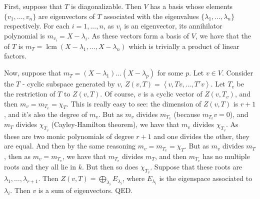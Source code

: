 \documentclass[12pt]{article}
\begin{document}
First, suppose that $T$ is diagonalizable. Then $V$ has a basis whose elements $\{v_{1}, \ldots, v_{n}\}$ are eigenvectors of $T$ associated with the eigenvalues $\{\lambda_{1}, \ldots, \lambda_{n}\}$ respectively. For each $i=1,...,n$, as $v_{i}$ is an eigenvector, its annihilator polynomial is $m_{v_{i}}=X-\lambda_{i}$. As these vectors form a basis of $V$, we have that the  of $T$ is $m_{T}=\operatorname{lcm}(X-\lambda_{1}, \ldots, X-\lambda_{n})$ which is trivially a product of linear factors.

Now, suppose that $m_{T}=(X-\lambda_{1}) \ldots (X-\lambda_{p})$ for some $p$.
Let $v \in V$. Consider the $T$ - cyclic subspace generated by $v$, $Z(v,T)=\left<v, Tv, \ldots, T^{r}v\right>$. Let $T_{v}$ be the restriction of $T$ to $Z(v,T)$. Of course, $v$ is a cyclic vector of $Z(v,T_{v})$, and then $m_{v}=m_{T_{v}}=\chi_{T}$. This is really easy to see: the dimension of $Z(v,T)$ is $r+1$, and it's also the degree of $m_{v}$. But as $m_{v}$ divides $m_{T_{v}}$ (because $m_{T_{v}}v=0$), and $m_{T}$ divides $\chi_{T_{v}}$ (Cayley-Hamilton theorem), we have that $m_{v}$ divides $\chi_{T_{v}}$. As these are two monic polynomials of degree $r+1$ and one divides the other, they are equal. And then by the same reasoning $m_{v}=m_{T_{v}}=\chi_{T}$.
But as $m_{v}$ divides $m_{T}$, then as $m_{v}=m_{T_{v}}$, we have that $m_{T_{v}}$ divides $m_{T}$, and then $m_{T_{v}}$ has no multiple roots and they all lie in $k$. But then so does $\chi_{T_{v}}$. Suppose that these roots are $\lambda_{1}, \ldots, \lambda_{r+1}$. Then $Z(v,T)=\bigoplus_{\lambda_{i}}E_{\lambda_{i}}$, where $E_{\lambda_{i}}$ is the eigenspace associated to $\lambda_{i}$. Then $v$ is a sum of eigenvectors. QED.
\end{document}
